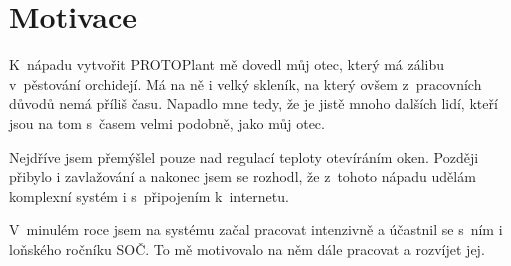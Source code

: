 \chapter{Motivace}
K~nápadu vytvořit  PROTOPlant mě dovedl můj otec, který má zálibu v~pěstování orchidejí.
Má na ně i velký skleník, na který ovšem z~pracovních důvodů nemá příliš času.
Napadlo mne tedy, že je jistě mnoho dalších lidí, kteří jsou na tom s~časem velmi podobně, jako můj otec.

Nejdříve jsem přemýšlel pouze nad regulací teploty otevíráním oken.
Později přibylo i zavlažování a nakonec jsem se rozhodl, že z~tohoto nápadu udělám komplexní systém i s~připojením k~internetu.

V~minulém roce jsem na systému začal pracovat intenzivně a účastnil se s~ním i loňského ročníku SOČ.
To mě motivovalo na něm dále pracovat a rozvíjet jej.

\newpage